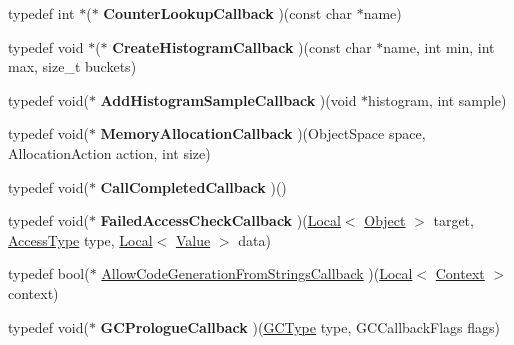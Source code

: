 \begin{DoxyCompactItemize}
\item 
\hypertarget{namespacev8_affefecdedfe2c7eee399b05fe7043ae3}{typedef int $\ast$($\ast$ {\bfseries Counter\-Lookup\-Callback} )(const char $\ast$name)}\label{namespacev8_affefecdedfe2c7eee399b05fe7043ae3}

\item 
\hypertarget{namespacev8_a6cd36cbab86f7dd9d163198da9a95d04}{typedef void $\ast$($\ast$ {\bfseries Create\-Histogram\-Callback} )(const char $\ast$name, int min, int max, size\-\_\-t buckets)}\label{namespacev8_a6cd36cbab86f7dd9d163198da9a95d04}

\item 
\hypertarget{namespacev8_a2f41909583b825db47c838b580d313a9}{typedef void($\ast$ {\bfseries Add\-Histogram\-Sample\-Callback} )(void $\ast$histogram, int sample)}\label{namespacev8_a2f41909583b825db47c838b580d313a9}

\item 
\hypertarget{namespacev8_a7b2f2578d863ff4239859053e6e29a41}{typedef void($\ast$ {\bfseries Memory\-Allocation\-Callback} )(Object\-Space space, Allocation\-Action action, int size)}\label{namespacev8_a7b2f2578d863ff4239859053e6e29a41}

\item 
\hypertarget{namespacev8_a5994ab57165248c9b95b97293e5aafcf}{typedef void($\ast$ {\bfseries Call\-Completed\-Callback} )()}\label{namespacev8_a5994ab57165248c9b95b97293e5aafcf}

\item 
\hypertarget{namespacev8_af2a04f5ac667fabb348eaafcde318438}{typedef void($\ast$ {\bfseries Failed\-Access\-Check\-Callback} )(\hyperlink{classv8_1_1Local}{Local}$<$ \hyperlink{classv8_1_1Object}{Object} $>$ target, \hyperlink{namespacev8_add8bef6469c5b94706584124e610046c}{Access\-Type} type, \hyperlink{classv8_1_1Local}{Local}$<$ \hyperlink{classv8_1_1Value}{Value} $>$ data)}\label{namespacev8_af2a04f5ac667fabb348eaafcde318438}

\item 
typedef bool($\ast$ \hyperlink{namespacev8_ac236e6d6b2b45dd69a3fa4408d63353f}{Allow\-Code\-Generation\-From\-Strings\-Callback} )(\hyperlink{classv8_1_1Local}{Local}$<$ \hyperlink{classv8_1_1Context}{Context} $>$ context)
\item 
\hypertarget{namespacev8_ab1b8c05dd6d75d0fbed8902b63580ed1}{typedef void($\ast$ {\bfseries G\-C\-Prologue\-Callback} )(\hyperlink{namespacev8_ac109d6f27e0c0f9ef4e98bcf7a806cf2}{G\-C\-Type} type, G\-C\-Callback\-Flags flags)}\label{namespacev8_ab1b8c05dd6d75d0fbed8902b63580ed1}


\end{DoxyCompactItemize}
